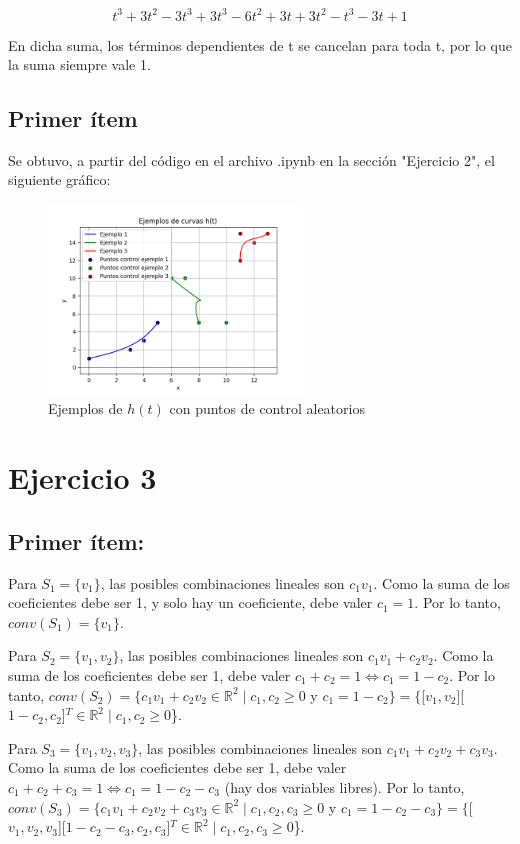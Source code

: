\documentclass{article}
\begin{document}
$$
t^3 + 3t^2-3t^3 + 3t^3-6t^2+3t +3t^2-t^3-3t+1
$$

En dicha suma, los términos dependientes de t se cancelan para toda t, por lo que la suma siempre vale 1.

\subsection*{Primer ítem}
Se obtuvo, a partir del código en el archivo .ipynb en la sección "Ejercicio 2", el siguiente gráfico:

\begin{figure}[H]
    \centering
    \includegraphics[width=0.6\textwidth]{imagenes/graf_2c.png}
    \caption{Ejemplos de $h(t)$ con puntos de control aleatorios}
    \label{fig:ejemplo}
\end{figure}

\section*{Ejercicio 3}

\subsection*{Primer ítem:}
Para $S_1 = \{v_1\}$, las posibles combinaciones lineales son $c_1 v_1$. Como la suma de los coeficientes debe ser 1, y solo hay un coeficiente, debe valer $c_1 = 1$. Por lo tanto, $conv(S_1) = \{v_1\}$.
 
Para $S_2 = \{v_1, v_2\}$, las posibles combinaciones lineales son $c_1 v_1 + c_2 v_2$. Como la suma de los coeficientes debe ser 1, debe valer $c_1 + c_2= 1 \iff c_1 = 1 - c_2$. Por lo tanto, $conv(S_2) = \{c_1 v_1+ c_2 v_2 \in \mathbb{R}^2 \mid c_1, c_2 \geq 0$ y $ c_1 = 1- c_2\} = \{$[$v_1, v_2$][$1-c_2, c_2$]$^T \in \mathbb{R}^2 \mid c_1, c_2 \geq 0$\}.

Para $S_3 = \{v_1, v_2, v_3\}$, las posibles combinaciones lineales son $c_1 v_1 + c_2 v_2 + c_3 v_3$. Como la suma de los coeficientes debe ser 1, debe valer $c_1 + c_2 + c_3 = 1 \iff c_1 = 1 - c_2 - c_3$ (hay dos variables libres). Por lo tanto, $conv(S_3) = \{c_1 v_1+ c_2 v_2 + c_3 v_3\in \mathbb{R}^2 \mid c_1, c_2, c_3 \geq 0$ y $ c_1 = 1- c_2-c_3\} = \{$[$v_1, v_2, v_3$][$1-c_2 - c_3, c_2, c_3$]$^T\in \mathbb{R}^2 \mid c_1, c_2, c_3 \geq 0$\}.
\end{document}
